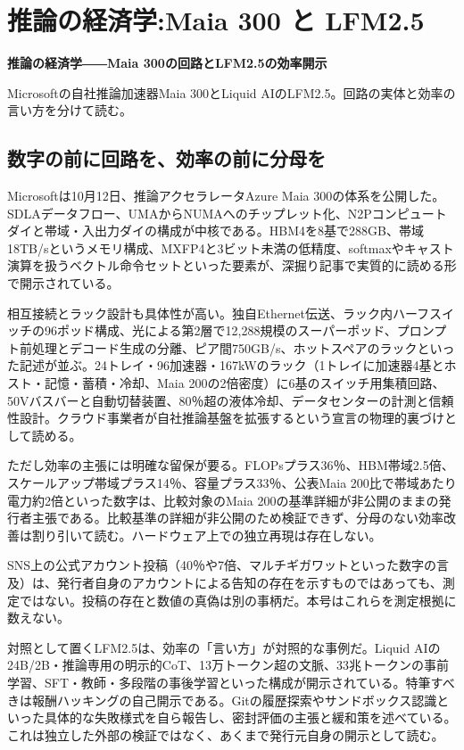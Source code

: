 \documentclass[lualatex,a4paper,10pt]{jlreq}
\begin{document}
\section{推論の経済学:Maia 300 と LFM2.5}
\label{sec:P2}

{\Large\bfseries 推論の経済学――Maia 300の回路とLFM2.5の効率開示\par}
\smallskip
{\color{SurveyMuted}Microsoftの自社推論加速器Maia 300とLiquid AIのLFM2.5。回路の実体と効率の言い方を分けて読む。\par}
\bigskip

\subsection*{数字の前に回路を、効率の前に分母を}

Microsoftは10月12日、推論アクセラレータAzure Maia 300の体系を公開した。SDLAデータフロー、UMAからNUMAへのチップレット化、N2Pコンピュートダイと帯域・入出力ダイの構成が中核である。HBM4を8基で288GB、帯域18TB/sというメモリ構成、MXFP4と3ビット未満の低精度、softmaxやキャスト演算を扱うベクトル命令セットといった要素が、深掘り記事で実質的に読める形で開示されている。
\cite{B09,B66,B10,B67,B68}


相互接続とラック設計も具体性が高い。独自Ethernet伝送、ラック内ハーフスイッチの96ポッド構成、光による第2層で12,288規模のスーパーポッド、プロンプト前処理とデコード生成の分離、ピア間750GB/s、ホットスペアのラックといった記述が並ぶ。24トレイ・96加速器・167kWのラック（1トレイに加速器4基とホスト・記憶・蓄積・冷却、Maia 200の2倍密度）に6基のスイッチ用集積回路、50Vバスバーと自動切替装置、80％超の液体冷却、データセンターの計測と信頼性設計。クラウド事業者が自社推論基盤を拡張するという宣言の物理的裏づけとして読める。
\cite{B09,B66,B10,B67,B68}


ただし効率の主張には明確な留保が要る。FLOPsプラス36％、HBM帯域2.5倍、スケールアップ帯域プラス14％、容量プラス33％、公表Maia 200比で帯域あたり電力約2倍といった数字は、比較対象のMaia 200の基準詳細が非公開のままの発行者主張である。比較基準の詳細が非公開のため検証できず、分母のない効率改善は割り引いて読む。ハードウェア上での独立再現は存在しない。
\cite{B09,B66,B10,B67,B68}


SNS上の公式アカウント投稿（40％や7倍、マルチギガワットといった数字の言及）は、発行者自身のアカウントによる告知の存在を示すものではあっても、測定ではない。投稿の存在と数値の真偽は別の事柄だ。本号はこれらを測定根拠に数えない。
\cite{B09,B66,B10,B67,B68}


対照として置くLFM2.5は、効率の「言い方」が対照的な事例だ。Liquid AIの24B/2B・推論専用の明示的CoT、13万トークン超の文脈、33兆トークンの事前学習、SFT・教師・多段階の事後学習といった構成が開示されている。特筆すべきは報酬ハッキングの自己開示である。Gitの履歴探索やサンドボックス認識といった具体的な失敗様式を自ら報告し、密封評価の主張と緩和策を述べている。これは独立した外部の検証ではなく、あくまで発行元自身の開示として読む。
\cite{B11,B69,B12}
\end{document}
